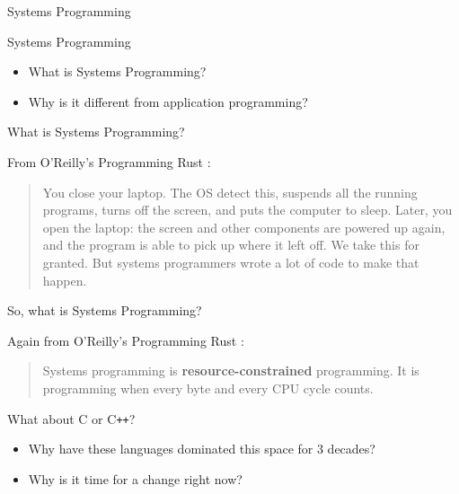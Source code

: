 \begin{section}{Systems Programming}

  \begin{frame}{Systems Programming}
    \begin{itemize}
    \item What is Systems Programming?
    \item Why is it different from application programming?
    \end{itemize}
  \end{frame}

  \begin{frame}{What is Systems Programming?}
    \begin{block}{From O'Reilly's Programming Rust \cite{ProgRustPreface1}:}
      \begin{quotation}
        You close your laptop. The OS detect this, suspends all the
        running programs, turns off the screen, and puts the computer to
        sleep. Later, you open the laptop: the screen and other components are
        powered up again, and the program is able to pick up where it left
        off. We take this for granted. But systems programmers wrote a lot of
        code to make that happen.
      \end{quotation}
    \end{block}
  \end{frame}

  \begin{frame}{So, what is Systems Programming?}
    \begin{block}{Again from O'Reilly's Programming Rust \cite{ProgRustPreface2}:}
      \begin{quotation}
        Systems programming is \textbf{resource-constrained}
        programming. It is programming when every byte and every CPU cycle
        counts.
      \end{quotation}
    \end{block}
  \end{frame}

  \begin{frame}{What about C or C\texttt{++}?}
    \begin{itemize}
    \item Why have these languages dominated this space for 3 decades?
    \item Why is it time for a change right now?
    \end{itemize}
  \end{frame}

\end{section}
